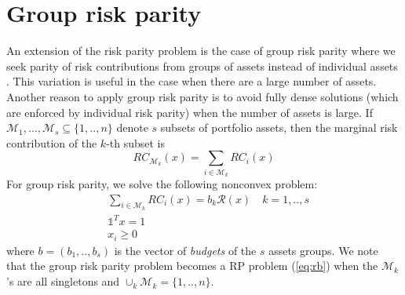 \section{Group risk parity}
An extension of the risk parity problem is the case of group risk parity where we seek parity of risk contributions from groups of assets instead of individual assets \cite{tutuncu}. This variation
is useful in the case when there are a large number of assets. Another reason to apply group risk parity is to avoid fully dense solutions (which are enforced by individual risk parity) when the number of assets is large. If $\mathcal{M}_1, ..., \mathcal{M}_s \subseteq \{1,..,n\}$ denote $s$ subsets of portfolio assets, then the marginal risk contribution of the $k$-th subset is
\begin{equation}
RC_{\mathcal{M}_k}(x) = \sum_{i \in \mathcal{M}_k} RC_i(x)
\end{equation} For group risk parity, we solve the following nonconvex problem:
\begin{equation}
\begin{aligned}
&\sum_{i \in \mathcal{M}_k} RC_i(x) = b_k \mathcal{R}(x) \quad k=1,..,s\\
&\mathds{1}^T x = 1\\
& x_i \geq 0
\end{aligned}
\end{equation}
where $b=(b_1,..,b_s)$ is the vector of \textit{budgets} of the $s$ assets groups. We note that the group risk parity problem becomes a RP problem (\ref{eq:rb}) when the $\mathcal{M}_k$'s are all singletons and $\cup_k \mathcal{M}_k = \{1,..,n\}$.
